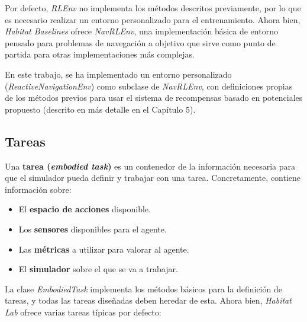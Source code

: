 Por defecto, \textit{RLEnv} no implementa los métodos descritos previamente, por lo que es necesario realizar un entorno personalizado para el entrenamiento. Ahora bien, \textit{Habitat Baselines} ofrece \textit{NavRLEnv}, una implementación básica de entorno pensado para problemas de navegación a objetivo que sirve como punto de partida para otras implementaciones más complejas.

En este trabajo, se ha implementado un entorno personalizado (\textit{ReactiveNavigationEnv}) como subclase de \textit{NavRLEnv}, con definiciones propias de los métodos previos para usar el sistema de recompensas basado en potenciales propuesto (descrito en más detalle en el Capítulo 5).

\subsection{Tareas}

Una \textbf{tarea (\textit{embodied task})} es un contenedor de la información necesaria para que el simulador pueda definir y trabajar con una tarea. Concretamente, contiene información sobre:

\begin{itemize}
	\item El \textbf{espacio de acciones} disponible.
	\item Los \textbf{sensores} disponibles para el agente.
	\item Las \textbf{métricas} a utilizar para valorar al agente.
	\item El \textbf{simulador} sobre el que se va a trabajar.
\end{itemize}

La clase \textit{EmbodiedTask} implementa los métodos básicos para la definición de tareas, y todas las tareas diseñadas deben heredar de esta. Ahora bien, \textit{Habitat Lab} ofrece varias tareas típicas por defecto:

